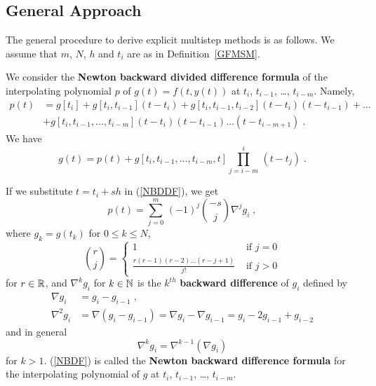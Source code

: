 \subsection{General Approach}

The general procedure to derive explicit multistep methods is as
follows.  We assume that $m$, $N$, $h$ and $t_i$ are as in
Definition~\ref{GFMSM}.

We consider the
{\bfseries Newton backward divided difference formula} 
of the interpolating polynomial $p$ of $g(t) = f(t,y(t))$ at
$t_i$, $t_{i-1}$, \ldots, $t_{i-m}$.  Namely,
\begin{equation} \label{NBDDF}
\begin{split}
p(t) & = g[t_i] + g[t_i,t_{i-1}](t-t_i) +
g[t_i,t_{i-1},t_{i-2}](t-t_i)(t-t_{i-1}) + \ldots \\
 &+ g[t_i,t_{i-1},\ldots,t_{i-m}](t-t_i)(t-t_{i-1})\ldots(t-t_{i-m+1}) \; .
\end{split}
\end{equation}
We have
\begin{equation} \label{errorNBDDF}
g(t) = p(t) +
g[t_i,t_{i-1},\ldots,t_{i-m},t]\prod_{j=i-m}^i\,(t-t_j) \;  .
\end{equation}

If we substitute $t=t_i + sh$ in (\ref{NBDDF}), we get
\begin{equation} \label{NBDF}
p(t) = \sum_{j=0}^m\,(-1)^j \binom{-s}{j}\nabla^j g_i \;  ,
\end{equation}
where $g_k = g(t_k)$ for $0 \leq k \leq N$,
\[
\binom{r}{j} = \begin{cases}
  1 & \text{ if $j=0$} \\
\displaystyle \frac{r(r-1)(r-2)\ldots(r-j+1)}{j!} & \text{ if $j>0$}
  \end{cases}
\]
for $r \in \mathbb{R}$, and $\nabla^k g_i$ for $k \in \mathbb{N}$ is the $k^{th}$
{\bfseries backward difference} of $g_i$ defined by
\begin{align*}
\nabla g_i &= g_i - g_{i-1} \; , \\
\nabla^2 g_i &= \nabla (g_i - g_{i-1})
= \nabla g_i - \nabla g_{i-1} = g_i - 2 g_{i-1} + g_{i-2}
\end{align*}
and in general
\[
\nabla^k g_i = \nabla^{k-1}\left(\nabla g_i \right)
\]
for $k>1$.  (\ref{NBDF}) is called the
{\bfseries Newton backward difference formula} for the interpolating 
polynomial of $g$ at $t_i$, $t_{i-1}$, \ldots, $t_{i-m}$.

